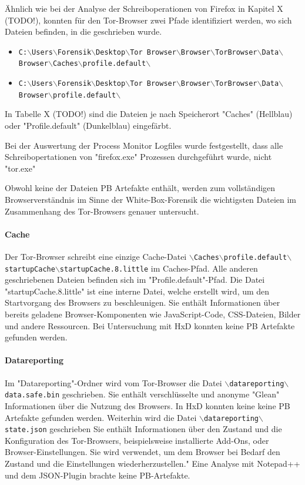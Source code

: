 Ähnlich wie bei der Analyse der Schreiboperationen von Firefox in Kapitel X (TODO!), konnten für den Tor-Browser zwei Pfade identifiziert werden, wo sich Dateien befinden, in die geschrieben wurde.
\begin{itemize}
\item[\textbf{Caches}] \texttt{C:$\backslash$Users$\backslash$Forensik$\backslash$Desktop$\backslash$Tor Browser$\backslash$Browser$\backslash$TorBrowser$\backslash$Data$\backslash$Browser$\backslash$Caches$\backslash$profile.default$\backslash$}
\item[\textbf{Profile.default}] \texttt{C:$\backslash$Users$\backslash$Forensik$\backslash$Desktop$\backslash$Tor Browser$\backslash$Browser$\backslash$TorBrowser$\backslash$Data$\backslash$Browser$\backslash$profile.default$\backslash$}
\end{itemize}
In Tabelle X (TODO!) sind die Dateien je nach Speicherort "Caches" (Hellblau) oder "Profile.default" (Dunkelblau)  eingefärbt. 

Bei der Auswertung der Process Monitor Logfiles wurde festgestellt, dass alle Schreibopertationen von "firefox.exe" Prozessen durchgeführt wurde, nicht "tor.exe" 

Obwohl keine der Dateien PB Artefakte enthält, werden zum vollständigen Browserverständnis im Sinne der White-Box-Forensik die wichtigsten Dateien im Zusammenhang des Tor-Browsers genauer untersucht.


\paragraph*{Cache}
Der Tor-Browser schreibt eine einzige Cache-Datei \texttt{$\backslash$Caches$\backslash$profile.default$\backslash$startupCache$\backslash$startupCache.8.little} im Caches-Pfad. Alle anderen geschriebenen Dateien befinden sich im "Profile.default"-Pfad.
Die Datei "startupCache.8.little" ist eine interne Datei, welche erstellt wird, um den Startvorgang des Browsers zu beschleunigen. Sie enthält Informationen über bereits geladene Browser-Komponenten wie JavaScript-Code, CSS-Dateien, Bilder und andere Ressourcen.  %
Bei Untersuchung mit HxD konnten keine PB Artefakte gefunden werden.

\paragraph*{Datareporting}
Im "Datareporting"-Ordner wird vom Tor-Browser die Datei \texttt{$\backslash$datareporting$\backslash$data.safe.bin} geschrieben. Sie enthält verschlüsselte und anonyme "Glean" Informationen über die Nutzung des Browsers. %
In HxD konnten keine keine PB Artefakte gefunden werden.
Weiterhin wird die Datei \texttt{$\backslash$datareporting$\backslash$state.json} geschrieben
Sie enthält Informationen über den Zustand und die Konfiguration des Tor-Browsers, beispielsweise installierte Add-Ons, oder Browser-Einstellungen. Sie wird verwendet, um dem Browser bei Bedarf den Zustand und die Einstellungen wiederherzustellen."
Eine Analyse mit Notepad++ und dem JSON-Plugin brachte keine PB-Artefakte.

